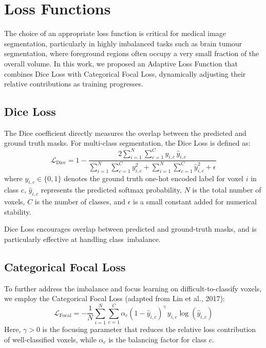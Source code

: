 
\section{Loss Functions}

The choice of an appropriate loss function is critical for medical image segmentation, particularly in highly imbalanced tasks such as brain tumour segmentation, where foreground regions often occupy a very small fraction of the overall volume. In this work, we proposed an Adaptive Loss Function that combines Dice Loss with Categorical Focal Loss, dynamically adjusting their relative contributions as training progresses.

\subsection{Dice Loss}

The Dice coefficient directly measures the overlap between the predicted and ground truth masks. For multi-class segmentation, the Dice Loss is defined as:
\begin{equation}
    \mathcal{L}_{\text{Dice}} = 1 -
    \frac{
    2 \sum_{i=1}^{N} \sum_{c=1}^{C} y_{i,c}\,\hat{y}_{i,c}
    }{
    \sum_{i=1}^{N} \sum_{c=1}^{C} y_{i,c}^{2}
    +
    \sum_{i=1}^{N} \sum_{c=1}^{C} \hat{y}_{i,c}^{2}
    +
    \epsilon
    }
    \label{Dice Loss}
\end{equation}
where $y_{i,c} \in \{0,1\}$ denotes the ground truth one-hot encoded label for voxel $i$ in class $c$, $\hat{y}_{i,c}$ represents the predicted softmax probability, $N$ is the total number of voxels, $C$ is the number of classes, and $\epsilon$ is a small constant added for numerical stability.

Dice Loss encourages overlap between predicted and ground-truth masks, and is particularly effective at handling class~imbalance.

\subsection{Categorical Focal Loss}

To further address the imbalance and focus learning on difficult-to-classify voxels, we employ the Categorical Focal Loss (adapted from Lin et al., 2017):
\begin{equation}
    \mathcal{L}_{\text{Focal}} = - \frac{1}{N}
    \sum_{i=1}^{N} \sum_{c=1}^{C}
    \alpha_c \left(1 - \hat{y}_{i,c}\right)^{\gamma}
    \, y_{i,c} \log\left(\hat{y}_{i,c}\right)
\end{equation}
Here, $\gamma > 0$ is the focusing parameter that reduces the relative loss contribution of well-classified voxels, while $\alpha_c$ is the balancing factor for class $c$.

